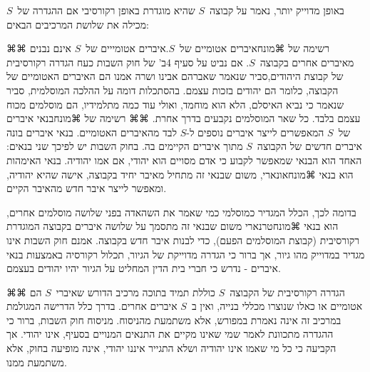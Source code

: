 באופן מדוייק יותר, נאמר על קבוצה~$S$ שהיא מוגדרת באופן רקורסיבי אם ההגדרה של~$S$ מכילה את שלושת המרכיבים הבאים:
\begin{enumerate}
⌘⌘ רשימה של ⌘מונח{איברים אטומיים} של~$S$.איברים אטומייים של~$S$ אינם נבנים מאיברים אחרים בקבוצה~$S$. אם נביט על סעיף 4ב' של חוק השבות כעח הגדרה רקורסיבית של קבוצת היהודים,סביר שנאמר שאברהם אבינו ושרה אמנו הם האיברים האטומיים של הקבוצה, כלומר הם יהודים בזכות עצמם. בהסתכלות דומה על ההלכה המוסלמית, סביר שנאמר כי נביא האיסלם, הלא הוא מוחמד, ואולי עוד כמה מתלמידיו, הם מוסלמים מכוח עצמם בלבד. כל שאר המוסלמים נקבעים בדרך אחרת.
⌘⌘ רשימה של ⌘מונח{בנאי איברים} של~$S$ המאפשרים לייצר איברים נוספים ל-$S$ לבד מהאיברים האטומיים. בנאי איברים בונה איברים חדשים של הקבוצה~$S$ מתוך איברים הקיימים בה. בחוק השבות יש לפיכך שני בנאים: האחד הוא הבנאי שמאפשר לקבוע כי אדם מסויים הוא יהודי, אם אמו יהודיה. בנאי האימהות הוא בנאי ⌘מונח{אונארי}, משום שבנאי זה מתחיל מאיבר יחיד בקבוצה, אישה שהיא יהודיה, ומאפשר לייצר איבר חדש מהאיבר הקיים.

בדומה לכך, הכלל המגדיר כמוסלמי כמי שאמר את השהאדה בפני שלושה מוסלמים אחרים, הוא בנאי ⌘מונח{טרנארי} משום שבנאי זה מתסמך על שלושה איברים בקבוצה המוגדרת רקורסיבית (קבוצת המוסלמים הפעם), כדי לבנות איבר חדש בקבוצה. אמנם חוק השבות אינו מגדיר במדוייק מהו גיור, אך ברור כי הגדרה מדוייקת של הגיור, תכלול רקורסיה באמצעות בנאי איברים - נדרש כי חברי בית הדין המחליט על הגיור יהיו יהודים בעצמם.

⌘⌘ הגדרה רקורסיבית של הקבוצה~$S$ כוללת תמיד בתוכה מרכיב הדורש שאיברי~$S$ הם אטומיים או כאלו שנוצרו מכללי בנייה, ואין ב~$S$ איברים אחרים. בדרך כלל הדרישה המגולמת במרכיב זה אינה נאמרת במפורש, אלא משתמעת מהניסוח. מניסוח חוק השבות, ברור כי ההגדרה מתכוונת לאמר שמי שאינו מקיים את התנאים המנויים בסעיף, אינו יהודי. אך הקביעה כי כל מי שאמו אינו יהודיה ושלא התגייר איננו יהודי, אינה מופיעה בחוק, אלא משתמעת ממנו.
\end{enumerate}

